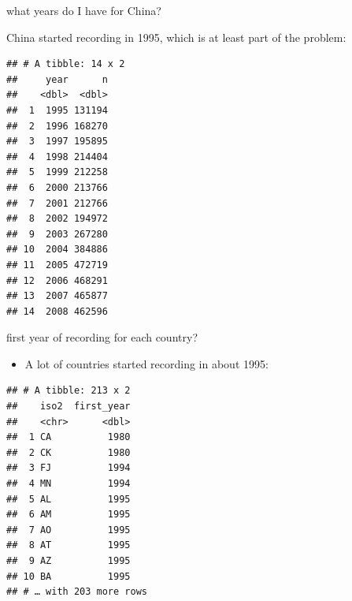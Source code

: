 \documentclass[ignorenonframetext,]{beamer}
\newenvironment{Shaded}{\begin{snugshade}}{\end{snugshade}}
\newcommand{\DataTypeTok}[1]{\textcolor[rgb]{0.13,0.29,0.53}{#1}}
\newcommand{\KeywordTok}[1]{\textcolor[rgb]{0.13,0.29,0.53}{\textbf{#1}}}
\newcommand{\NormalTok}[1]{#1}
\newcommand{\OperatorTok}[1]{\textcolor[rgb]{0.81,0.36,0.00}{\textbf{#1}}}
\newcommand{\StringTok}[1]{\textcolor[rgb]{0.31,0.60,0.02}{#1}}
\providecommand{\tightlist}{%
  \setlength{\itemsep}{0pt}\setlength{\parskip}{0pt}}
\begin{document}
\begin{frame}[fragile]{what years do I have for China?}
\protect\hypertarget{what-years-do-i-have-for-china}{}

China started recording in 1995, which is at least part of the problem:

\begin{Shaded}
\end{Shaded}

\begin{verbatim}
## # A tibble: 14 x 2
##     year      n
##    <dbl>  <dbl>
##  1  1995 131194
##  2  1996 168270
##  3  1997 195895
##  4  1998 214404
##  5  1999 212258
##  6  2000 213766
##  7  2001 212766
##  8  2002 194972
##  9  2003 267280
## 10  2004 384886
## 11  2005 472719
## 12  2006 468291
## 13  2007 465877
## 14  2008 462596
\end{verbatim}

\end{frame}

\begin{frame}[fragile]{first year of recording for each country?}
\protect\hypertarget{first-year-of-recording-for-each-country}{}

\begin{itemize}
\tightlist
\item
  A lot of countries started recording in about 1995:
\end{itemize}

\begin{Shaded}
\end{Shaded}

\begin{verbatim}
## # A tibble: 213 x 2
##    iso2  first_year
##    <chr>      <dbl>
##  1 CA          1980
##  2 CK          1980
##  3 FJ          1994
##  4 MN          1994
##  5 AL          1995
##  6 AM          1995
##  7 AO          1995
##  8 AT          1995
##  9 AZ          1995
## 10 BA          1995
## # … with 203 more rows
\end{verbatim}

\end{frame}
\end{document}
